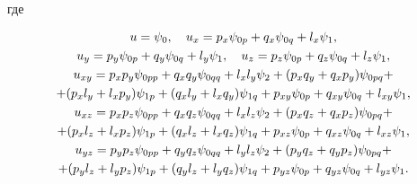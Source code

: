\begin{thm}
\begin{gather}
\end{gather}


где


\begin{gather}


u=\psi_{0},\quad u_{x}=p_{x}\psi_{0p}+q_{x}\psi_{0q}+l_{x}\psi_{1},\notag\\


%


u_{y}=p_{y}\psi_{0p}+q_{y}\psi_{0q}+l_{y}\psi_{1},\quad


u_{z}=p_{z}\psi_{0p}+q_{z}\psi_{0q}+l_{z}\psi_{1},\notag\\


%


u_{xy}=p_{x}p_{y}\psi_{0pp}+q_{x}q_{y}\psi_{0qq}+l_{x}l_{y}\psi_{2}


+(p_{x}q_{y}+q_{x}p_{y})\psi_{0pq}+\notag\\


%


+(p_{x}l_{y}+ l_{x}p_{y})\psi_{1p}+


(q_{x}l_{y}+l_{x}q_{y})\psi_{1q}+p_{xy}\psi_{0p}


+q_{xy}\psi_{0q}+l_{xy}\psi_{1},\notag\\


%


u_{xz}=p_{x}p_{z}\psi_{0pp}+q_{x}q_{z}\psi_{0qq}+l_{x}l_{z}\psi_{2}


+(p_{x}q_{z}+q_{x}p_{z})\psi_{0pq}+\notag\\


%


+(p_{x}l_{z}+ l_{x}p_{z})\psi_{1p}+


(q_{x}l_{z}+l_{x}q_{z})\psi_{1q}+p_{xz}\psi_{0p}


+q_{xz}\psi_{0q}+l_{xz}\psi_{1},\notag\\


%


u_{yz}=p_{y}p_{z}\psi_{0pp}+q_{y}q_{z}\psi_{0qq}+l_{y}l_{z}\psi_{2}


+(p_{y}q_{z}+q_{y}p_{z})\psi_{0pq}+\notag\\


%


+(p_{y}l_{z}+ l_{y}p_{z})\psi_{1p}+


(q_{y}l_{z}+l_{y}q_{z})\psi_{1q}+p_{yz}\psi_{0p}


+q_{yz}\psi_{0q}+l_{yz}\psi_{1}.


\end{gather}


\end{thm}





